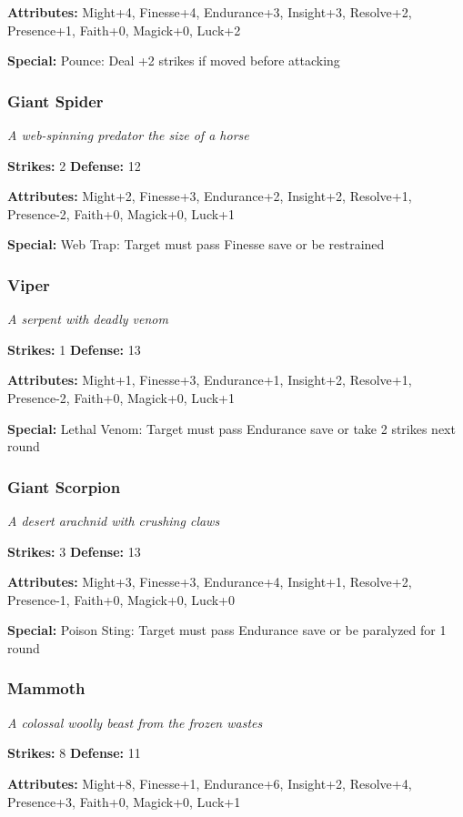 \documentclass[10pt,twoside]{article}
\begin{document}
\textbf{Attributes:} Might+4, Finesse+4, Endurance+3, Insight+3, Resolve+2, Presence+1, Faith+0, Magick+0, Luck+2

\textbf{Special:} Pounce: Deal +2 strikes if moved before attacking

\subsubsection{Giant Spider}
\textit{A web-spinning predator the size of a horse}

\textbf{Strikes:} 2 \quad \textbf{Defense:} 12

\textbf{Attributes:} Might+2, Finesse+3, Endurance+2, Insight+2, Resolve+1, Presence-2, Faith+0, Magick+0, Luck+1

\textbf{Special:} Web Trap: Target must pass Finesse save or be restrained

\subsubsection{Viper}
\textit{A serpent with deadly venom}

\textbf{Strikes:} 1 \quad \textbf{Defense:} 13

\textbf{Attributes:} Might+1, Finesse+3, Endurance+1, Insight+2, Resolve+1, Presence-2, Faith+0, Magick+0, Luck+1

\textbf{Special:} Lethal Venom: Target must pass Endurance save or take 2 strikes next round

\subsubsection{Giant Scorpion}
\textit{A desert arachnid with crushing claws}

\textbf{Strikes:} 3 \quad \textbf{Defense:} 13

\textbf{Attributes:} Might+3, Finesse+3, Endurance+4, Insight+1, Resolve+2, Presence-1, Faith+0, Magick+0, Luck+0

\textbf{Special:} Poison Sting: Target must pass Endurance save or be paralyzed for 1 round

\subsubsection{Mammoth}
\textit{A colossal woolly beast from the frozen wastes}

\textbf{Strikes:} 8 \quad \textbf{Defense:} 11

\textbf{Attributes:} Might+8, Finesse+1, Endurance+6, Insight+2, Resolve+4, Presence+3, Faith+0, Magick+0, Luck+1
\end{document}
